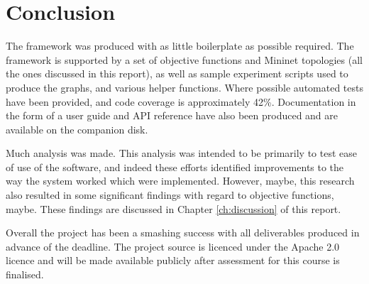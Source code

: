 \chapter{Conclusion}
\label{ch:conclusion}

The framework was produced with as little boilerplate as possible required. The framework is supported by a set of objective functions and Mininet topologies (all the ones discussed in this report), as well as sample experiment scripts used to produce the graphs, and various helper functions. Where possible automated tests have been provided, and code coverage is approximately 42\%. Documentation in the form of a user guide and API reference have also been produced and are available on the companion disk.

Much analysis was made. This analysis was intended to be primarily to test ease of use of the software, and indeed these efforts identified improvements to the way the system worked which were implemented. However, maybe, this research also resulted in some significant findings with regard to objective functions, maybe. These findings are discussed in Chapter \ref{ch:discussion} of this report.

Overall the project has been a smashing success with all deliverables produced in advance of the deadline. The project source is licenced under the Apache 2.0 licence and will be made available publicly after assessment for this course is finalised.
